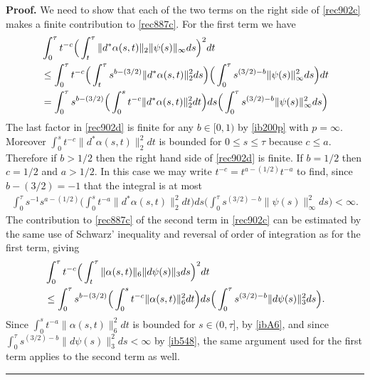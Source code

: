 \documentclass[12pt]{article}
\newenvironment{proof}[1][Proof]{\textbf{#1.} }{\ \rule{0.5em}{0.5em}}
\def \({\Big(}
\def \){\Big)}
\def \eref{\eqref}
\numberwithin{equation}{section}
\begin{document}
\begin{proof}
We need to show that each of the two terms on the right side of \eref{rec902c} 
makes a finite contribution to \eref{rec887c}.
For the first term we have
\begin{align}
&\int_0^\tau t^{-c} \(\int_t^\tau \|d^* \alpha(s,t)\|_2  \|\psi(s)\|_\infty ds \)^2 dt   \notag \\
&\le \int_0^\tau t^{-c} \(\int_t^\tau s^{b-(3/2)}\|d^* \alpha(s,t)\|_2^2ds\)
   \(\int_0^\tau s^{(3/2) -b} \| \psi(s)\|_\infty^2  ds\) dt   \notag\\
   &=\int_0^\tau s^{b -(3/2) }\(\int_0^s  t^{-c}\|d^* \alpha(s,t)\|_2^2dt\) ds 
          \(\int_0^\tau s^{(3/2) -b} \|  \psi(s)\|_\infty^2  ds\)       \label{rec902d}
\end{align}
The last factor in \eref{rec902d} is finite for any $b \in [0,1)$ by \eref{ib200p} with $p =\infty$.
Moreover  $\int_0^s  t^{-c}\|d^* \alpha(s,t)\|_2^2dt$   is bounded for $0\le s \le \tau$ because $c \le a$.
Therefore if $b > 1/2$ then the right hand side of \eref{rec902d}  is finite.  
 If $b =1/2$ then $c = 1/2$ and $a > 1/2$. In this case we may write $t^{-c} = t^{a -(1/2)} t^{-a}$
to find, since $b-(3/2) = -1$ that the integral is at most
\begin{align*}
\int_0^\tau s^{-1} s^{a - (1/2)}\(\int_0^s  t^{-a}\|d^* \alpha(s,t)\|_2^2dt\) ds 
          \(\int_0^\tau s^{(3/2) -b} \|  \psi(s)\|_\infty^2  ds\) < \infty.
          \end{align*}
The contribution to \eref{rec887c} of the second term in \eref{rec902c} can be estimated
by the same use of Schwarz' inequality 
and reversal of order of integration as for the first term, giving
\begin{align}
&\int_0^\tau t^{-c} \(\int_t^\tau \|\alpha(s,t)\|_6  \| d \psi(s)\|_3  ds \)^2 dt   \notag \\
   &\le \int_0^\tau s^{b -(3/2) }\(\int_0^s  t^{-c}\|\alpha(s,t)\|_6^2dt\) ds 
          \(\int_0^\tau s^{(3/2) -b} \| d \psi(s)\|_3^2  ds\).                   
\end{align}
Since $\int_0^s t^{-a}\|\alpha(s,t)\|_6^2dt$ is bounded for $s \in (0, \tau]$, by \eref{ibA6},
and  since \linebreak
$\int_0^\tau    s^{(3/2) -b} \| d \psi(s)\|_3^2  ds <\infty$ by \eref{ib548}, the same argument used for the first term applies to the second term as  well.
\end{proof}
\end{document}

